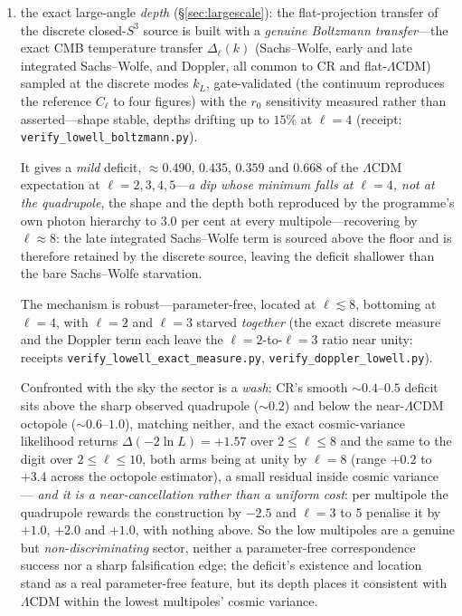 \documentclass[11pt,a4paper]{article}
\theoremstyle{plain}
\theoremstyle{definition}
\theoremstyle{remark}
\begin{document}
\begin{enumerate}
\item the exact large-angle \emph{depth} (\S\ref{sec:largescale}): the flat-projection transfer of the discrete closed-$S^3$ source is built with a \emph{genuine Boltzmann transfer}---the exact CMB temperature transfer $\Delta_\ell(k)$ (Sachs--Wolfe, early and late integrated Sachs--Wolfe, and Doppler, all common to CR and flat-$\Lambda$CDM) sampled at the discrete modes $k_L$, gate-validated (the continuum reproduces the reference $C_\ell$ to four figures) with the $r_0$ sensitivity measured rather than asserted---shape stable, depths drifting up to $15\%$ at $\ell=4$ (receipt: \texttt{verify\_lowell\_boltzmann.py}). 

It gives a \emph{mild} deficit, $\approx0.490$, $0.435$, $0.359$ and $0.668$ of the $\Lambda$CDM expectation at $\ell=2,3,4,5$---\emph{a dip whose minimum falls at $\ell=4$, not at the quadrupole}, the shape and the depth both reproduced by the programme's own photon hierarchy to $3.0$ per cent at every multipole---recovering by $\ell\approx8$: the late integrated Sachs--Wolfe term is sourced above the floor and is therefore retained by the discrete source, leaving the deficit shallower than the bare Sachs--Wolfe starvation. 

The mechanism is robust---parameter-free, located at $\ell\lesssim8$, bottoming at $\ell=4$, with $\ell=2$ and $\ell=3$ starved \emph{together} (the exact discrete measure and the Doppler term each leave the $\ell=2$-to-$\ell=3$ ratio near unity: receipts \texttt{verify\_lowell\_exact\_measure.py}, \texttt{verify\_doppler\_lowell.py}). 

Confronted with the sky the sector is a \emph{wash}: CR's smooth $\sim0.4$--$0.5$ deficit sits above the sharp observed quadrupole ($\sim0.2$) and below the near-$\Lambda$CDM octopole ($\sim0.6$--$1.0$), matching neither, and the exact cosmic-variance likelihood returns $\Delta(-2\ln L)=+1.57$ over $2\le\ell\le8$ and the same to the digit over $2\le\ell\le10$, both arms being at unity by $\ell=8$ (range $+0.2$ to $+3.4$ across the octopole estimator), a small residual inside cosmic variance --- \emph{and it is a near-cancellation rather than a uniform cost}: per multipole the quadrupole rewards the construction by $-2.5$ and $\ell=3$ to $5$ penalise it by $+1.0$, $+2.0$ and $+1.0$, with nothing above. So the low multipoles are a genuine but \emph{non-discriminating} sector, neither a parameter-free correspondence success nor a sharp falsification edge; the deficit's existence and location stand as a real parameter-free feature, but its depth places it consistent with $\Lambda$CDM within the lowest multipoles' cosmic variance.


\end{enumerate}
\end{document}
